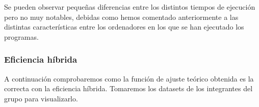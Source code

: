 \documentclass[10pt,a4paper]{article}
\begin{document}
\begin{table}[h!]
	\centering
	\footnotesize
	\hspace{2cm}
	\hspace{2cm}
	\caption{Experiencia empírica de algoritmo de Heapsort}
\end{table}

Se pueden observar pequeñas diferencias entre los distintos tiempos de ejecución pero no muy notables, debidas como hemos comentado anteriormente a las distintas características entre los ordenadores en los que se han ejecutado los programas.

\subsubsection{Eficiencia híbrida}
A continuación comprobaremos como la función de ajuste teórico obtenida es la correcta con la eficiencia híbrida. Tomaremos los datasets de los integrantes del grupo para visualizarlo. \\
\end{document}
